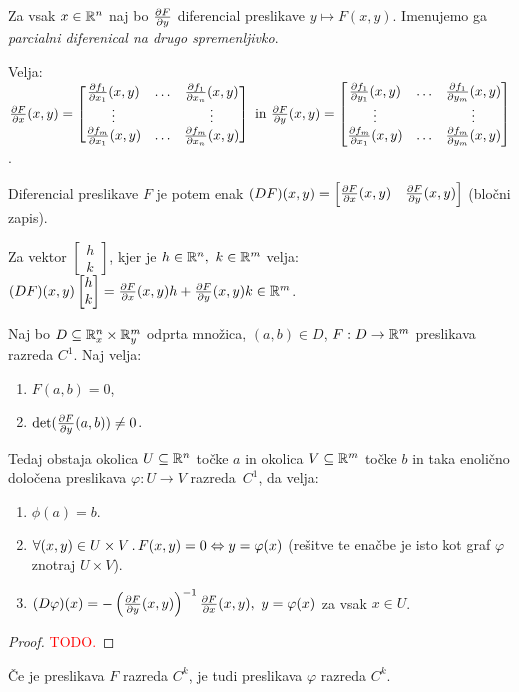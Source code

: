 Za vsak $x \in \mathbb{R}^n$ naj bo $\frac{\partial F}{\partial y}$ diferencial preslikave $y \mapsto F(x,y)$. Imenujemo ga \emph{parcialni diferenical na drugo spremenljivko}. 

Velja: 
$\frac{\partial F}{\partial x}(x,y) = \begin{bmatrix}
    \frac{\partial f_1}{\partial x_1}(x,y) & \ldots & \frac{\partial f_1}{\partial x_n}(x,y) \\
    \vdots & & \vdots \\
    \frac{\partial f_m}{\partial x_1}(x,y) & \ldots & \frac{\partial f_m}{\partial x_n}(x,y) 
\end{bmatrix} \text{ in } \frac{\partial F}{\partial y}(x,y) = \begin{bmatrix}
    \frac{\partial f_1}{\partial y_1}(x,y) & \ldots & \frac{\partial f_1}{\partial y_m}(x,y) \\
    \vdots & & \vdots \\
    \frac{\partial f_m}{\partial x_1}(x,y) & \ldots & \frac{\partial f_m}{\partial y_m}(x,y) 
\end{bmatrix}$.

Diferencial preslikave $F$ je potem enak $(DF)(x,y) = \begin{bmatrix}
    \frac{\partial F}{\partial x}(x,y) & \frac{\partial F}{\partial y}(x,y)
\end{bmatrix}$ (bločni zapis).

Za vektor $\begin{bmatrix}
    h \\ k
\end{bmatrix}$, kjer je $h \in \mathbb{R}^n, \ k \in \mathbb{R}^m$ velja: $(DF)(x,y)  \begin{bmatrix}
    h \\ k
\end{bmatrix} = \frac{\partial F}{\partial x}(x,y)  h + \frac{\partial F}{\partial y}(x,y)  k \in \mathbb{R}^m$.

\begin{izrek}
    Naj bo $D\subseteq \mathbb{R}_x^n \times \mathbb{R}_y^m$ odprta množica, $(a, b) \in D$, $F: D \to \mathbb{R}^m$ preslikava razreda $C^1$. Naj velja:
    \begin{enumerate}
        \item $F(a, b) = 0$,
        \item $\det(\frac{\partial F}{\partial y}(a,b)) \neq 0$.
    \end{enumerate}
    Tedaj obstaja okolica $U \subseteq \mathbb{R}^n$ točke $a$ in okolica $V \subseteq \mathbb{R}^m$ točke $b$ in taka enolično določena preslikava $\varphi: U \to V$ razreda~$C^1$, da velja:
    \begin{enumerate}
        \item $\phi(a) = b$.
        \item $\forall (x,y) \in U \times V \,.\, F(x,y) = 0 \Leftrightarrow y = \varphi(x)$ (rešitve te enačbe je isto kot graf $\varphi$ znotraj $U \times V$).
        \item $(D \varphi)(x) = - \left(\frac{\partial F}{\partial y}(x,y)\right)^{-1} \frac{\partial F}{\partial x}(x,y), \ y = \varphi(x)$ za vsak $x \in U$.
    \end{enumerate}
\end{izrek}

\begin{proof}
    \textcolor{red}{TODO.}
\end{proof}

\begin{posledica}
    Če je preslikava $F$ razreda $C^k$, je tudi preslikava $\varphi$ razreda $C^k$.
\end{posledica}